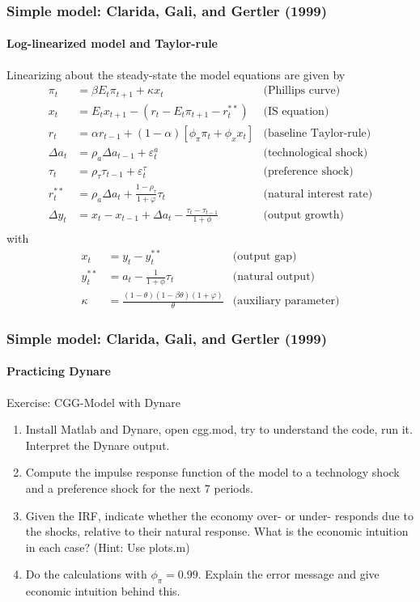 \documentclass[handout]{beamer}  %
\newcounter{saveenumi}
\newcommand{\seti}{\setcounter{saveenumi}{\value{enumi}}}
\begin{document}
\begin{frame}\frametitle{Simple model: Clarida, Gali, and Gertler (1999)}\framesubtitle{Log-linearized model and Taylor-rule}
Linearizing about the steady-state the model equations are given by\footnotesize
\begin{align*}
\pi_{t} &=\beta E_{t}\pi _{t+1}+\kappa x_{t} &\text{(Phillips curve)} \\
x_{t} &= E_{t}x_{t+1}-\left( r_{t}-E_{t}\pi _{t+1}-r_{t}^{**}\right) &\text{(IS equation)} \\
r_{t} &=\alpha r_{t-1}+(1-\alpha )\left[ \phi _{\pi }\pi _{t}+\phi _{x}x_{t}\right] &\text{(baseline Taylor-rule)} \\
\Delta a_t &= \rho_a \Delta a_{t-1} + \varepsilon_{t}^a &\text{(technological shock)}\\
\tau_t &= \rho_\tau \tau_{t-1} + \varepsilon_{t}^\tau &\text{(preference shock)}\\
r_{t}^{**} &= \rho_a \Delta a_{t}+\frac{1-\rho_\tau}{1+\varphi } \tau_t &\text{(natural interest rate)} \\
\Delta y_t &= x_{t} - x_{t-1} + \Delta a_t - \frac{\tau_t - \tau_{t-1}}{1+\phi} &\text{(output growth)}\\
\end{align*}
with
\begin{align*}
x_{t} &=y_{t}-y_{t}^{**}&\text{(output gap)}\\
y_{t}^{**} &=a_{t}-\frac{1}{1+\phi }\tau _{t}&\text{(natural output)}\\
\kappa &= \frac{(1-\theta)(1-\beta \theta) (1+\varphi)}{\theta} &\text{(auxiliary parameter)}
\end{align*}
\end{frame}

\begin{frame}\frametitle{Simple model: Clarida, Gali, and Gertler (1999)}\framesubtitle{Practicing Dynare}
Exercise: CGG-Model with Dynare
\begin{enumerate}
  \item Install Matlab and Dynare, open cgg.mod, try to understand the code, run it. Interpret the Dynare output.
  \item Compute the impulse response function of the model to a technology shock and a preference shock for the next 7 periods.
  \item Given the IRF, indicate whether the economy over- or under- responds due to the shocks, relative to their natural response. What is the economic intuition in each case? (Hint: Use plots.m)
  \item Do the calculations with $\phi_\pi=0.99$. Explain the error message and give economic intuition behind this.
\seti\end{enumerate}
\end{frame}
\end{document}
